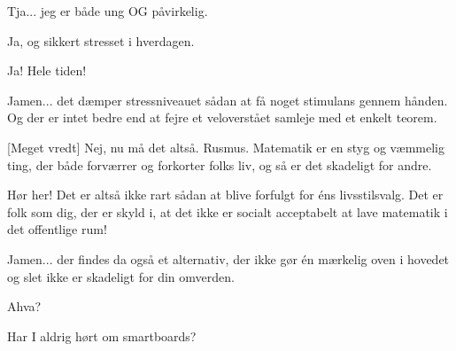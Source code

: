 \documentclass[a4paper,11pt]{article}
\begin{document}
\begin{sketch}
 Tja... jeg er både ung OG påvirkelig.

 Ja, og sikkert stresset i hverdagen.

 Ja! Hele tiden!

 Jamen... det dæmper stressniveauet sådan at få noget stimulans gennem hånden. Og der er intet bedre end at fejre et veloverstået samleje med et enkelt teorem.

[Meget vredt] Nej, nu må det altså. Rusmus. Matematik er en styg og væmmelig ting, der både forværrer og forkorter folks liv, og så er det skadeligt for andre.

 Hør her! Det er altså ikke rart sådan at blive forfulgt for éns livsstilsvalg. Det er folk som dig, der er skyld i, at det ikke er socialt acceptabelt at lave matematik i det offentlige rum!

 Jamen... der findes da også et alternativ, der ikke gør én mærkelig oven i hovedet og slet ikke er skadeligt for din omverden.

 Ahva?


 Har I aldrig hørt om smartboards?

\end{sketch}
\end{document}
